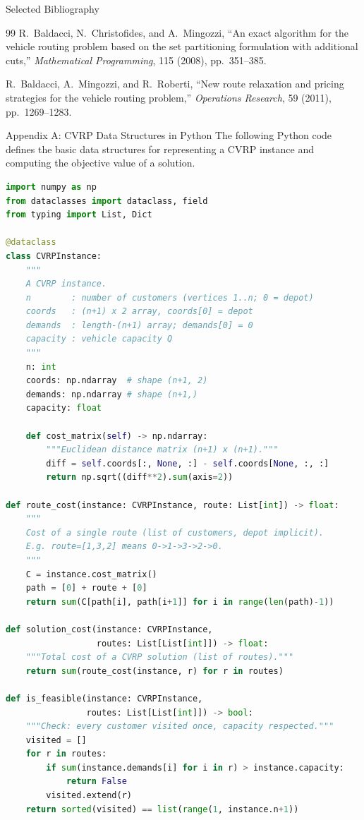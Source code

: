 \documentclass[aspectratio=169,10pt]{beamer}
\begin{document}
\begin{frame}[allowframebreaks]{Selected Bibliography}
\begin{thebibliography}{99}
      R.~Baldacci, N.~Christofides, and A.~Mingozzi, ``An exact algorithm for
      the vehicle routing problem based on the set partitioning formulation
      with additional cuts,'' \textit{Mathematical Programming}, 115 (2008),
      pp.~351--385.

      R.~Baldacci, A.~Mingozzi, and R.~Roberti, ``New route relaxation and
      pricing strategies for the vehicle routing problem,''
      \textit{Operations Research}, 59 (2011), pp.~1269--1283.
  \end{thebibliography}
\end{frame}


\appendix

\begin{frame}[fragile]{Appendix A: CVRP Data Structures in Python}
  The following Python code defines the basic data structures for
  representing a CVRP instance and computing the objective value
  of a solution.

\begin{lstlisting}[language=Python, caption={CVRP instance and solution evaluation}]
import numpy as np
from dataclasses import dataclass, field
from typing import List, Dict

@dataclass
class CVRPInstance:
    """
    A CVRP instance.
    n        : number of customers (vertices 1..n; 0 = depot)
    coords   : (n+1) x 2 array, coords[0] = depot
    demands  : length-(n+1) array; demands[0] = 0
    capacity : vehicle capacity Q
    """
    n: int
    coords: np.ndarray  # shape (n+1, 2)
    demands: np.ndarray # shape (n+1,)
    capacity: float

    def cost_matrix(self) -> np.ndarray:
        """Euclidean distance matrix (n+1) x (n+1)."""
        diff = self.coords[:, None, :] - self.coords[None, :, :]
        return np.sqrt((diff**2).sum(axis=2))

def route_cost(instance: CVRPInstance, route: List[int]) -> float:
    """
    Cost of a single route (list of customers, depot implicit).
    E.g. route=[1,3,2] means 0->1->3->2->0.
    """
    C = instance.cost_matrix()
    path = [0] + route + [0]
    return sum(C[path[i], path[i+1]] for i in range(len(path)-1))

def solution_cost(instance: CVRPInstance,
                  routes: List[List[int]]) -> float:
    """Total cost of a CVRP solution (list of routes)."""
    return sum(route_cost(instance, r) for r in routes)

def is_feasible(instance: CVRPInstance,
                routes: List[List[int]]) -> bool:
    """Check: every customer visited once, capacity respected."""
    visited = []
    for r in routes:
        if sum(instance.demands[i] for i in r) > instance.capacity:
            return False
        visited.extend(r)
    return sorted(visited) == list(range(1, instance.n+1))
\end{lstlisting}
\end{frame}
\end{document}
